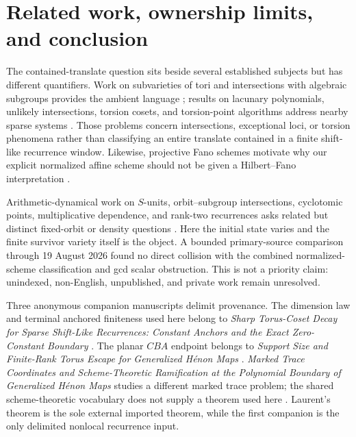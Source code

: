 \documentclass[11pt]{article}
\theoremstyle{remark}
\numberwithin{equation}{section}
\begin{document}
\section{Related work, ownership limits, and conclusion}\label{sec:conclusion}

The contained-translate question sits beside several established subjects but has different quantifiers.  Work on subvarieties of tori and intersections with algebraic subgroups provides the ambient language \citep{habegger2008intersecting,suciuyangzhao2013intersections}; results on lacunary polynomials, unlikely intersections, torsion cosets, and torsion-point algorithms address nearby sparse systems \citep{corvajalevinzannier2021intersections,amorososombrazannier2017unlikely,martinez2019torsion,leroux2012torsion,dillgallinaro2025likely}.  Those problems concern intersections, exceptional loci, or torsion phenomena rather than classifying an entire translate contained in a finite shift-like recurrence window.  Likewise, projective Fano schemes motivate why our explicit normalized affine scheme should not be given a Hilbert--Fano interpretation \citep{iltenzotine2017fano,iltenkelly2022fano}.

Arithmetic-dynamical work on \(S\)-units, orbit--subgroup intersections, cyclotomic points, multiplicative dependence, and rank-two recurrences asks related but distinct fixed-orbit or density questions \citep{bellchenhossain2021rational,bellghioca2024orbits,jixiezhang2025cyclotomic,melloyasufuku2026integrality,zhang2026ranktwo}.  Here the initial state varies and the finite survivor variety itself is the object.  A bounded primary-source comparison through 19 August 2026 found no direct collision with the combined normalized-scheme classification and gcd scalar obstruction.  This is not a priority claim: unindexed, non-English, unpublished, and private work remain unresolved.

Three anonymous companion manuscripts delimit provenance.  The dimension law and terminal anchored finiteness used here belong to \emph{Sharp Torus-Coset Decay for Sparse Shift-Like Recurrences: Constant Anchors and the Exact Zero-Constant Boundary} \citep{companionDecay}.  The planar \(CBA\) endpoint belongs to \emph{Support Size and Finite-Rank Torus Escape for Generalized Hénon Maps} \citep{companionSupport}.  \emph{Marked Trace Coordinates and Scheme-Theoretic Ramification at the Polynomial Boundary of Generalized Hénon Maps} studies a different marked trace problem; the shared scheme-theoretic vocabulary does not supply a theorem used here \citep{companionTrace}.  Laurent's theorem is the sole external imported theorem, while the first companion is the only delimited nonlocal recurrence input.
\end{document}
